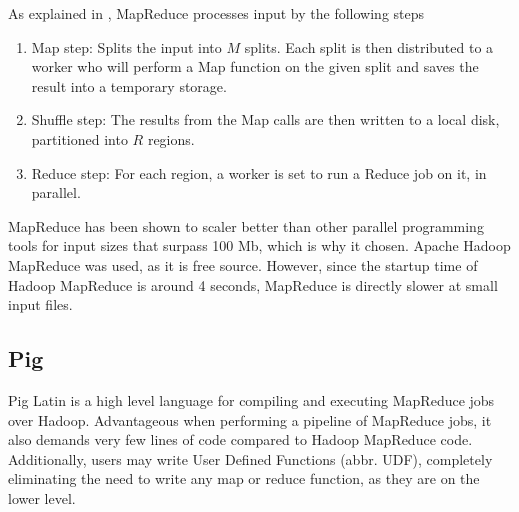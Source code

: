 \documentclass[../../main.tex]{subfiles}
\begin{document}
 As explained in \cite{mapreduceExplained}, MapReduce processes input by the following steps
\begin{enumerate}
\item Map step: Splits the input into $M$ splits. Each split is then distributed to a worker who will perform a Map function on the given split and saves the result into a temporary storage.
\item Shuffle step: The results from the Map calls are then written to a local disk, partitioned into $R$ regions.
\item Reduce step: For each region, a worker is set to run a Reduce job on it, in parallel.
\end{enumerate}

MapReduce has been shown to scaler better than other parallel programming tools for input sizes that surpass 100 Mb, which is why it chosen.\cite{compForkMapRed} Apache Hadoop MapReduce was used, as it is free source. However, since the startup time of Hadoop MapReduce is around 4 seconds, MapReduce is directly slower at small input files.

\subsection{Pig}
Pig Latin is a high level language for compiling and executing MapReduce jobs over Hadoop. Advantageous when performing a pipeline of MapReduce jobs\cite{pig}, it also demands very few lines of code compared to Hadoop MapReduce code. Additionally, users may write User Defined Functions (abbr. UDF), completely eliminating the need to write any map or reduce function, as they are on the lower level.


 
\end{document}
